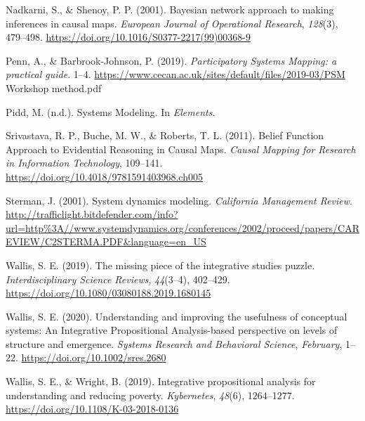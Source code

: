 \documentclass[
]{book}
\begin{document}
Nadkarni, S., \& Shenoy, P. P. (2001). Bayesian network approach to making inferences in causal maps. \emph{European Journal of Operational Research}, \emph{128}(3), 479--498. \url{https://doi.org/10.1016/S0377-2217(99)00368-9}

Penn, A., \& Barbrook-Johnson, P. (2019). \emph{Participatory Systems Mapping: a practical guide}. 1--4. \url{https://www.cecan.ac.uk/sites/default/files/2019-03/PSM} Workshop method.pdf

Pidd, M. (n.d.). Systems Modeling. In \emph{Elements}.

Srivastava, R. P., Buche, M. W., \& Roberts, T. L. (2011). Belief Function Approach to Evidential Reasoning in Causal Maps. \emph{Causal Mapping for Research in Information Technology}, 109--141. \url{https://doi.org/10.4018/9781591403968.ch005}

Sterman, J. (2001). System dynamics modeling. \emph{California Management Review}. \url{http://trafficlight.bitdefender.com/info?url=http\%3A//www.systemdynamics.org/conferences/2002/proceed/papers/CAREVIEW/C2STERMA.PDF\&language=en_US}

Wallis, S. E. (2019). The missing piece of the integrative studies puzzle. \emph{Interdisciplinary Science Reviews}, \emph{44}(3--4), 402--429. \url{https://doi.org/10.1080/03080188.2019.1680145}

Wallis, S. E. (2020). Understanding and improving the usefulness of conceptual systems: An Integrative Propositional Analysis-based perspective on levels of structure and emergence. \emph{Systems Research and Behavioral Science}, \emph{February}, 1--22. \url{https://doi.org/10.1002/sres.2680}

Wallis, S. E., \& Wright, B. (2019). Integrative propositional analysis for understanding and reducing poverty. \emph{Kybernetes}, \emph{48}(6), 1264--1277. \url{https://doi.org/10.1108/K-03-2018-0136}

  
\end{document}

